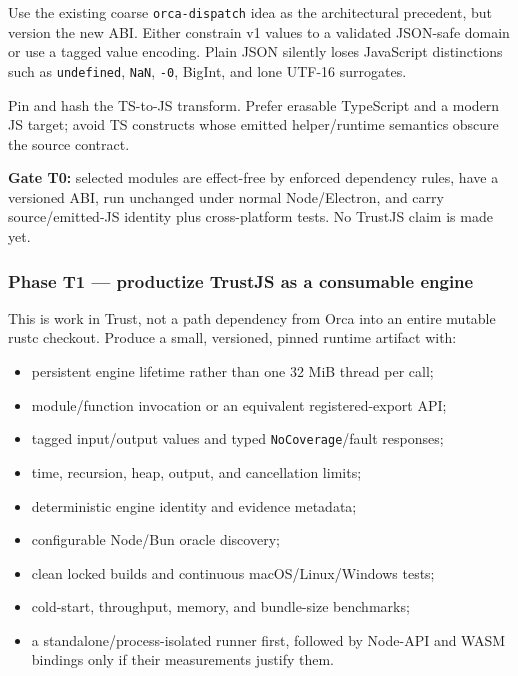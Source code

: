 \documentclass[
  10pt,
  letterpaper,
]{article}
\providecommand{\tightlist}{%
  \setlength{\itemsep}{0pt}\setlength{\parskip}{0pt}}
\begin{document}
Use the existing coarse \texttt{orca-dispatch} idea as the architectural
precedent, but version the new ABI. Either constrain v1 values to a
validated JSON-safe domain or use a tagged value encoding. Plain JSON
silently loses JavaScript distinctions such as \texttt{undefined},
\texttt{NaN}, \texttt{-0}, BigInt, and lone UTF-16 surrogates.

Pin and hash the TS-to-JS transform. Prefer erasable TypeScript and a
modern JS target; avoid TS constructs whose emitted helper/runtime
semantics obscure the source contract.

\textbf{Gate T0:} selected modules are effect-free by enforced
dependency rules, have a versioned ABI, run unchanged under normal
Node/Electron, and carry source/emitted-JS identity plus cross-platform
tests. No TrustJS claim is made yet.

\subsubsection{Phase T1 --- productize TrustJS as a consumable
engine}\label{phase-t1--productize-trustjs-as-a-consumable-engine}

This is work in Trust, not a path dependency from Orca into an entire
mutable rustc checkout. Produce a small, versioned, pinned runtime
artifact with:

\begin{itemize}
\tightlist
\item
  persistent engine lifetime rather than one 32 MiB thread per call;
\item
  module/function invocation or an equivalent registered-export API;
\item
  tagged input/output values and typed \texttt{NoCoverage}/fault
  responses;
\item
  time, recursion, heap, output, and cancellation limits;
\item
  deterministic engine identity and evidence metadata;
\item
  configurable Node/Bun oracle discovery;
\item
  clean locked builds and continuous macOS/Linux/Windows tests;
\item
  cold-start, throughput, memory, and bundle-size benchmarks;
\item
  a standalone/process-isolated runner first, followed by Node-API and
  WASM bindings only if their measurements justify them.
\end{itemize}
\end{document}
